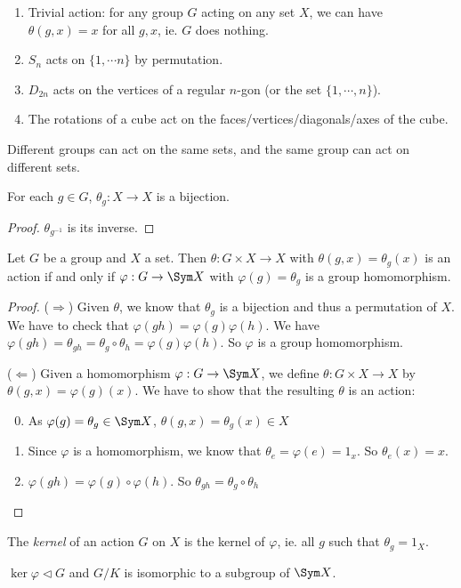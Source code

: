 \documentclass[a4paper]{article}
\begin{document}
\begin{eg}\leavevmode
  \begin{enumerate}
    \item Trivial action: for any group $G$ acting on any set $X$, we can have $\theta(g, x) = x$ for all $g, x$, ie. $G$ does nothing.
    \item $S_n$ acts on $\{1, \cdots n\}$ by permutation.
    \item $D_{2n}$ acts on the vertices of a regular $n$-gon (or the set $\{1, \cdots, n\}$).
    \item The rotations of a cube act on the faces/vertices/diagonals/axes of the cube.
  \end{enumerate}
\end{eg}
\note Different groups can act on the same sets, and the same group can act on different sets.

\begin{lemma}
  For each $g\in G$, $\theta_g: X\to X$ is a bijection.
\end{lemma}

\begin{proof}
  $\theta_{g^{-1}}$ is its inverse.
\end{proof}

\begin{prop}
  Let $G$ be a group and $X$ a set. Then $\theta: G\times X\to X$ with $\theta(g, x) = \theta_g(x)$ is an action if and only if $\varphi: G\to \Sym X$ with $\varphi(g) = \theta_g$ is a group homomorphism.
\end{prop}

\begin{proof}
  ($\Rightarrow$) Given $\theta$, we know that $\theta_g$ is a bijection and thus a permutation of $X$. We have to check that $\varphi(gh) = \varphi(g)\varphi(h)$. We have $\varphi(gh) = \theta_{gh} = \theta_g\circ \theta_h = \varphi(g)\varphi(h)$. So $\varphi$ is a group homomorphism.

  ($\Leftarrow$) Given a homomorphism $\varphi: G\to \Sym X$, we define $\theta: G\times X\to X$ by $\theta(g, x) = \varphi(g)(x)$. We have to show that the resulting $\theta$ is an action:
  \begin{enumerate}[label=\arabic{*}.]
      \setcounter{enumi}{-1}
    \item As $\varphi(g) = \theta_g\in \Sym X$, $\theta(g, x) = \theta_g (x)\in X$
    \item Since $\varphi$ is a homomorphism, we know that $\theta_e  = \varphi(e) = 1_x$. So $\theta_e(x) = x$.
    \item $\varphi (gh) = \varphi(g)\circ \varphi(h)$. So $\theta_{gh} = \theta_g\circ \theta_h$
  \end{enumerate}
\end{proof}
\begin{defi}
  The \emph{kernel} of an action $G$ on $X$ is the kernel of $\varphi$, ie. all $g$ such that $\theta_g = 1_X$.
\end{defi}
\note $\ker \varphi\lhd G$ and $G/K$ is isomorphic to a subgroup of $\Sym X$.
\end{document}
